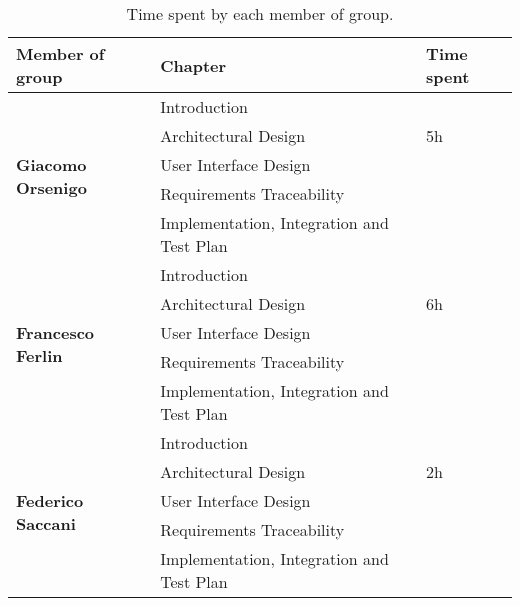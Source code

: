 \begin{table}[H]
    \centering
    \begin{tabular}{|l|l|l|}
        \hline
        \textbf{Member of group }                  & \textbf{Chapter}                          & \textbf{Time spent} \\\hline
        \multirow{5}{*}{\textbf{Giacomo Orsenigo}} & Introduction                              &                     \\
                                                   & Architectural Design                      & 5h                  \\
                                                   & User Interface Design                     &                     \\
                                                   & Requirements Traceability                 &                     \\
                                                   & Implementation, Integration and Test Plan &                     \\\hline
        \multirow{5}{*}{\textbf{Francesco Ferlin}} & Introduction                              &                     \\
                                                   & Architectural Design                      & 6h                  \\
                                                   & User Interface Design                     &                     \\
                                                   & Requirements Traceability                 &                     \\
                                                   & Implementation, Integration and Test Plan &                     \\\hline
        \multirow{5}{*}{\textbf{Federico Saccani}} & Introduction                              &                     \\
                                                   & Architectural Design                      & 2h                  \\
                                                   & User Interface Design                     &                     \\
                                                   & Requirements Traceability                 &                     \\
                                                   & Implementation, Integration and Test Plan &                     \\\hline
    \end{tabular}
    \caption{Time spent by each member of group.}
    \label{table:Time spent}
\end{table}
